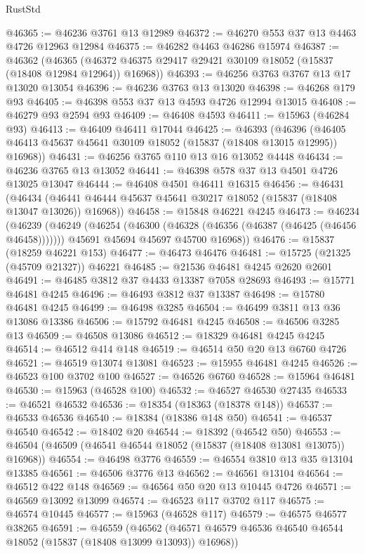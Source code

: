 \begin{lexlean}{RustStd}
\begin{coremodule}
{\begin{coremodule}
{{{{{{{{{{{{{{{{{{{{{{{{{{{{{{{{{{{{{{{{{{{{{{{{{{{{{{{{{{{{@46365 := @46236 @3761 @13 @12989
@46372 := @46270 @553 @37 @13 @4463 @4726 @12963 @12984
@46375 := @46282 @4463 @46286 @15974
@46387 := @46362
    (@46365 (@46372 @46375 @29417 @29421 @30109 @18052 (@15837 (@18408 @12984 @12964)) @16968))
@46393 := @46256 @3763 @3767 @13 @17 @13020 @13054
@46396 := @46236 @3763 @13 @13020
@46398 := @46268 @179 @93
@46405 := @46398 @553 @37 @13 @4593 @4726 @12994 @13015
@46408 := @46279 @93 @2594 @93
@46409 := @46408 @4593
@46411 := @15963 (@46284 @93)
@46413 := @46409 @46411 @17044
@46425 := @46393
    (@46396 (@46405 @46413 @45637 @45641 @30109 @18052 (@15837 (@18408 @13015 @12995)) @16968))
@46431 := @46256 @3765 @110 @13 @16 @13052 @4448
@46434 := @46236 @3765 @13 @13052
@46441 := @46398 @578 @37 @13 @4501 @4726 @13025 @13047
@46444 := @46408 @4501 @46411 @16315
@46456 := @46431
    (@46434 (@46441 @46444 @45637 @45641 @30217 @18052 (@15837 (@18408 @13047 @13026)) @16968))
@46458 := @15848 @46221 @4245
@46473 := @46234
    (@46239
      (@46249
        (@46254 (@46300 (@46328 (@46356 (@46387 (@46425 (@46456 @46458)))))))
        @45691
        @45694
        @45697
        @45700
        @16968))
@46476 := @15837 (@18259 @46221 @153)
@46477 := @46473 @46476
@46481 := @15725 (@21325 (@45709 @21327)) @46221
@46485 := @21536 @46481 @4245 @2620 @2601
@46491 := @46485 @3812 @37 @4433 @13387 @7058 @28693
@46493 := @15771 @46481 @4245
@46496 := @46493 @3812 @37 @13387
@46498 := @15780 @46481 @4245
@46499 := @46498 @3285
@46504 := @46499 @3811 @13 @36 @13086 @13386
@46506 := @15792 @46481 @4245
@46508 := @46506 @3285 @13
@46509 := @46508 @13086
@46512 := @18329 @46481 @4245 @4245
@46514 := @46512 @414 @148
@46519 := @46514 @50 @20 @13 @6760 @4726
@46521 := @46519 @13074 @13081
@46523 := @15955 @46481 @4245
@46526 := @46523 @100 @3702 @100
@46527 := @46526 @6760
@46528 := @15964 @46481
@46530 := @15963 (@46528 @100)
@46532 := @46527 @46530 @27435
@46533 := @46521 @46532
@46536 := @18354 (@18363 (@18378 @148))
@46537 := @46533 @46536
@46540 := @18384 (@18386 @148 @50)
@46541 := @46537 @46540
@46542 := @18402 @20
@46544 := @18392 (@46542 @50)
@46553 := @46504 (@46509 (@46541 @46544 @18052 (@15837 (@18408 @13081 @13075)) @16968))
@46554 := @46498 @3776
@46559 := @46554 @3810 @13 @35 @13104 @13385
@46561 := @46506 @3776 @13
@46562 := @46561 @13104
@46564 := @46512 @422 @148
@46569 := @46564 @50 @20 @13 @10445 @4726
@46571 := @46569 @13092 @13099
@46574 := @46523 @117 @3702 @117
@46575 := @46574 @10445
@46577 := @15963 (@46528 @117)
@46579 := @46575 @46577 @38265
@46591 := @46559
    (@46562 (@46571 @46579 @46536 @46540 @46544 @18052 (@15837 (@18408 @13099 @13093)) @16968))
}}}}}}}}}}}}}}}}}}}}}}}}}}}}}}}}}}}}}}}}}}}}}}}}}}}}}}}}}}}}
\end{coremodule}}
\end{coremodule}
\end{lexlean}

